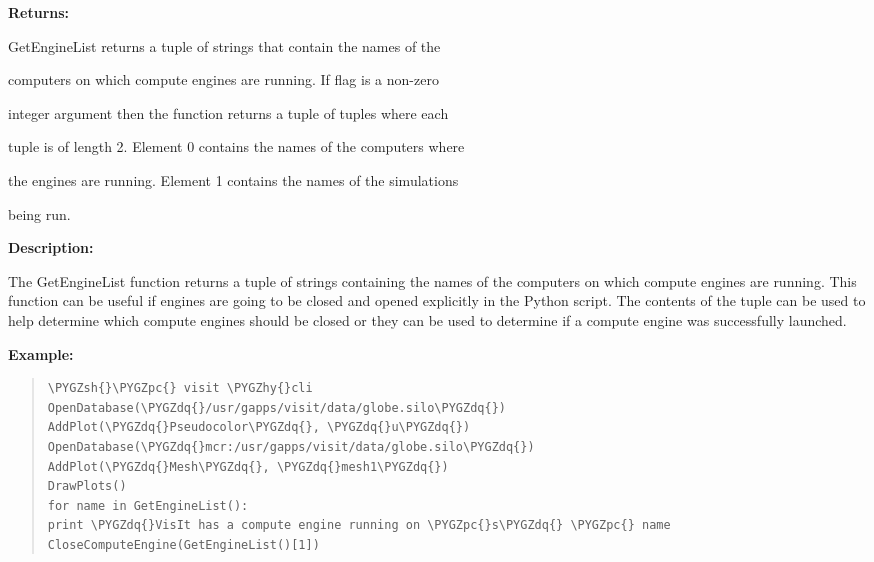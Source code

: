 \documentclass[letterpaper,10pt,english]{sphinxmanual}
\def\PYGZsh{\char`\#}
\def\PYGZpc{\char`\%}
\def\PYGZhy{\char`\-}
\def\PYGZdq{\char`\"}
\begin{document}
\begin{DUlineblock}{0em}
\item[] 
\item[] \textbf{Returns:}
\item[] GetEngineList returns a tuple of strings that contain the names of the
\item[] computers on which compute engines are running. If flag is a non-zero
\item[] integer argument then the function returns a tuple of tuples where each
\item[] tuple is of length 2. Element 0 contains the names of the computers where
\item[] the engines are running. Element 1 contains the names of the simulations
\item[] being run.
\item[] 
\item[] \textbf{Description:}
\item[] The GetEngineList function returns a tuple of strings containing the names
of the computers on which compute engines are running. This function can be
useful if engines are going to be closed and opened explicitly in the
Python script. The contents of the tuple can be used to help determine
which compute engines should be closed or they can be used to determine if
a compute engine was successfully launched.
\end{DUlineblock}

\begin{DUlineblock}{0em}
\item[] 
\end{DUlineblock}

\begin{DUlineblock}{0em}
\item[] \textbf{Example:}
\item[] 
\end{DUlineblock}
\begin{quote}

\begin{Verbatim}[commandchars=\\\{\}]
\PYGZsh{}\PYGZpc{} visit \PYGZhy{}cli
OpenDatabase(\PYGZdq{}/usr/gapps/visit/data/globe.silo\PYGZdq{})
AddPlot(\PYGZdq{}Pseudocolor\PYGZdq{}, \PYGZdq{}u\PYGZdq{})
OpenDatabase(\PYGZdq{}mcr:/usr/gapps/visit/data/globe.silo\PYGZdq{})
AddPlot(\PYGZdq{}Mesh\PYGZdq{}, \PYGZdq{}mesh1\PYGZdq{})
DrawPlots()
for name in GetEngineList():
print \PYGZdq{}VisIt has a compute engine running on \PYGZpc{}s\PYGZdq{} \PYGZpc{} name
CloseComputeEngine(GetEngineList()[1])
\end{Verbatim}
\end{quote}
\end{document}
